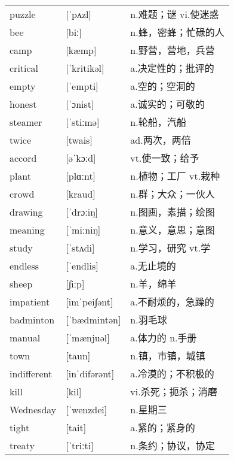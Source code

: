 \documentclass[a4paper]{article}
\begin{document}
\section{}
\begin{tabular}{l l l}

puzzle & [ˈpʌzl] & n.难题；谜 vi.使迷惑 \\
bee & [biː] & n.蜂，密蜂；忙碌的人 \\
camp & [kæmp] & n.野营，营地，兵营 \\
critical & [ˈkritikəl] & a.决定性的；批评的 \\
empty & [ˈempti] & a.空的；空洞的 \\
honest & [ˈɔnist] & a.诚实的；可敬的 \\
steamer & [ˈstiːmə] & n.轮船，汽船 \\
twice & [twais] & ad.两次，两倍 \\
accord & [əˈkɔːd] & vt.使一致；给予 \\
plant & [plɑːnt] & n.植物；工厂 vt.栽种 \\
crowd & [kraud] & n.群；大众；一伙人 \\
drawing & [ˈdrɔːiŋ] & n.图画，素描；绘图 \\
meaning & [ˈmiːniŋ] & n.意义，意思；意图 \\
study & [ˈstʌdi] & n.学习，研究 vt.学 \\
endless & [ˈendlis] & a.无止境的 \\
sheep & [∫iːp] & n.羊，绵羊 \\
impatient & [imˈpei∫ənt] & a.不耐烦的，急躁的 \\
badminton & [ˈbædmintən] & n.羽毛球 \\
manual & [ˈmænjuəl] & a.体力的 n.手册 \\
town & [taun] & n.镇，市镇，城镇 \\
indifferent & [inˈdifərənt] & a.冷漠的；不积极的 \\
kill & [kil] & vi.杀死；扼杀；消磨 \\
Wednesday & [ˈwenzdei] & n.星期三 \\
tight & [tait] & a.紧的；紧身的 \\
treaty & [ˈtriːti] & n.条约；协议，协定 \\

\end{tabular}
\end{document}
